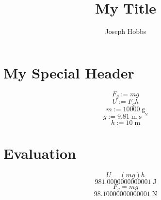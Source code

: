 \documentclass[12pt]{article}
\begin{document}
\title{\textbf{My Title}}
\author{Joseph Hobbs}
\maketitle


\section{My Special Header}


$$
F_{g} := m g
$$
$$
U := F_{g} h
$$
$$
m := 10000 \; \mathrm{g}
$$
$$
g := 9.81 \; \mathrm{m} \; \mathrm{s^{-2}}
$$
$$
h := 10 \; \mathrm{m}
$$


\section{Evaluation}


$$
U = (m g) h
$$
$$
981.0000000000001 \; \mathrm{J}
$$
$$
F_{g} = m g
$$
$$
98.10000000000001 \; \mathrm{N}
$$
\end{document}
